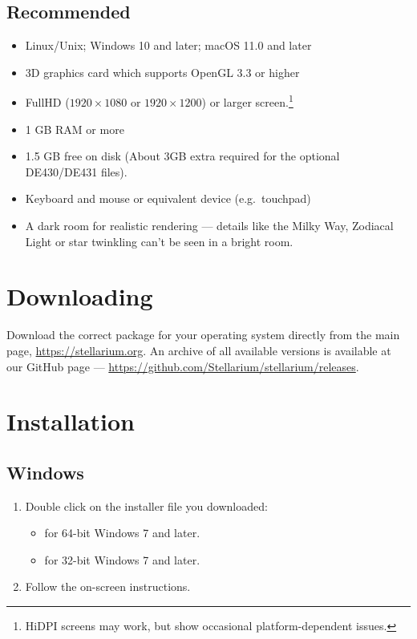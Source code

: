 \subsection{Recommended}
\begin{itemize}
\item Linux/Unix; Windows 10 and later; macOS 11.0 and later
\item 3D graphics card which supports OpenGL 3.3 or higher
\item FullHD ($1920\times1080$ or $1920\times1200$) or larger screen.\footnote{HiDPI screens may work, but show occasional platform-dependent issues.}
\item 1 GB RAM or more
\item 1.5 GB free on disk (About 3GB extra required for the optional DE430/DE431 files).
\item Keyboard and mouse or equivalent device (e.g.\ touchpad)
\item A dark room for realistic rendering --- details like the Milky Way, Zodiacal Light 
      or star twinkling can't be seen in a bright room.
\end{itemize}


\section{Downloading}
\label{sec:GettingStarted:Downloading}

Download the correct package for your operating system directly from the main page, \newline \url{https://stellarium.org}.
An archive of all available versions is available at our GitHub page --- \url{https://github.com/Stellarium/stellarium/releases}.

\section{Installation}
\label{sec:GettingStarted:Installation}

\subsection{Windows}
\label{sec:GettingStarted:Installation:Windows}

\begin{enumerate}
\item Double click on the installer file you downloaded:
\begin{itemize}
\item {} for 64-bit Windows 7 and later.
\item {} for 32-bit Windows 7 and later.
\end{itemize}
\item Follow the on-screen instructions.
\end{enumerate}

